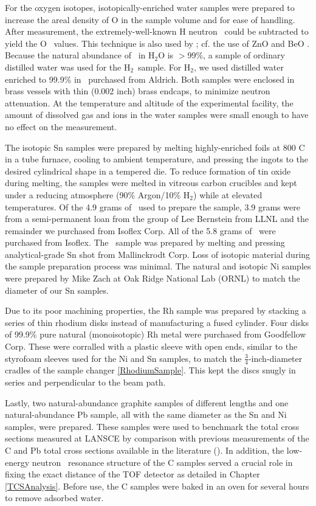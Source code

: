 For the oxygen isotopes, isotopically-enriched water samples were prepared to
increase the areal density of O in the sample volume and for ease of handling.
After measurement, the
extremely-well-known H neutron \tot\ could be subtracted to yield the O \tot\ values.
This technique is also used by \cite{Vaughn1965, Salisbury1965}; cf. 
the use of ZnO and BeO \cite{Finlay1993}.
Because the natural abundance of \oSix\ in H$_{2}$O is $>$99\%, a sample of
ordinary distilled water was used for the H$_{2}$\oSix\ sample. For H$_{2}$\oEight,
we used distilled water enriched to 99.9\% in \oEight\, purchased from
Aldrich. Both samples were enclosed in brass vessels with thin
(0.002 inch) brass endcaps, to minimize neutron attenuation. At the temperature and
altitude of the experimental facility, the amount of dissolved gas and ions
in the water samples were small enough to have no effect on the measurement.

The isotopic Sn samples were prepared by melting highly-enriched foils at 
800 C in a tube furnace, cooling to ambient temperature, and pressing the ingots
to the desired cylindrical shape in a tempered die. To reduce formation of tin
oxide during melting, the samples were melted in vitreous carbon crucibles
and kept under a reducing atmosphere (90\% Argon/10\% H$_{2}$) while at elevated
temperatures. Of the 4.9 grams of \snTwelve\ used to prepare the sample,
3.9 grams were from a semi-permanent loan from the group of Lee Bernstein from LLNL
and the remainder we purchased from Isoflex Corp. All of the 5.8 grams of \snFour\
were purchased from Isoflex. The \snNat\ sample was prepared by melting and
pressing analytical-grade Sn shot from Mallinckrodt Corp. Loss of isotopic
material during the sample preparation process was minimal.
The natural and isotopic Ni samples were 
prepared by Mike Zach at Oak Ridge National Lab (ORNL) to match the diameter of our Sn samples.

Due to its poor machining properties, the Rh sample was prepared by
stacking a series of thin rhodium disks instead of manufacturing a
fused cylinder. Four disks of 99.9\% pure natural (monoisotopic) Rh metal were purchased from
Goodfellow Corp. These were corralled with a
plastic sleeve with open ends, similar to the styrofoam sleeves used for the Ni
and Sn samples, to match the $\frac{3}{4}$-inch-diameter cradles of the sample changer
\ref{RhodiumSample}.
This kept the discs snugly in series and perpendicular to the beam path.

Lastly, two natural-abundance graphite samples of different lengths and one
natural-abundance Pb sample, all with the same diameter as the Sn and Ni samples, were
prepared. These samples were used to benchmark the total cross sections
measured at LANSCE by comparison with previous measurements of the C and
Pb total cross sections available in the literature
(\cite{Finlay1993,Abfalterer2001}). In addition, the low-energy neutron \tot\ resonance
structure of the C samples served a crucial role in fixing the exact distance
of the TOF detector as detailed in Chapter \ref{TCSAnalysis}.
Before use, the C samples were baked in an oven for several
hours to remove adsorbed water.


